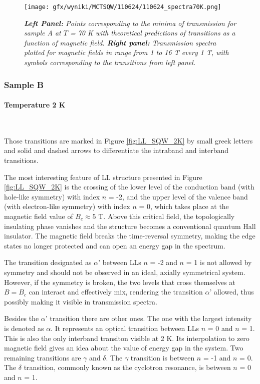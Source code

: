 \documentclass[titlepage,a4paper]{book}
\newcommand{\wciecie}{\quad\phantom{v}}
\newcommand{\myparagraph}[1]{\paragraph{#1}\mbox{}\\}
\begin{document}
\begin{figure}[ht]
	\centering
	\texttt{[image: gfx/wyniki/MCTSQW/110624/110624\_spectra70K.png]}
	\vspace{-10pt}
	\caption{\textit{\textbf{Left Panel:} Points corresponding to the minima of transmission for sample A at $T$ = 70 K with theoretical predictions of transitions as a function of magnetic field. \textbf{Right panel:} Transmission spectra plotted for magnetic fields in range from 1 to 16 T every 1 T, with symbols corresponding to the transitions from left panel.}}
	\label{fig:Spectra_110624_70K}
\end{figure}

\clearpage
\subsubsection{Sample B}
\myparagraph{Temperature 2 K}
\wciecie

Those transitions are marked in Figure \ref{fig:LL_SQW_2K} by small greek letters and solid and dashed arrows to differentiate the intraband and interband transitions.

The most interesting feature of LL structure presented in Figure \ref{fig:LL_SQW_2K} is the crossing of the lower level of the conduction band (with hole-like symmetry) with index $n$ = -2, and the upper level of the valence band (with electron-like symmetry) with index $n$ = 0, which takes place at the magnetic field value of $B_c \approx 5$ T. Above this critical field, the topologically insulating phase vanishes and the structure becomes a conventional quantum Hall insulator. The magnetic field breaks the time-reversal symmetry, making the edge states no longer protected and can open an energy gap in the spectrum.

The transition designated as $\alpha$' between LLs $n$ = -2 and $n$ = 1 is not allowed by symmetry and should not be observed in an ideal, axially symmetrical system. However, if the symmetry is broken, the two levels that cross themselves at $B = B_c$ can interact and effectively mix, rendering the transition $\alpha$' allowed, thus possibly making it visible in transmission spectra.

Besides the $\alpha$' transition there are other ones. The one with the largest intensity is denoted as $\alpha$. It represents an optical transition between LLs $n$ = 0 and $n$ = 1. This is also the only interband transiton visible at 2 K. Its interpolation to zero magnetic field gives an idea about the value of energy gap in the system. Two remaining transitions are $\gamma$ and $\delta$. The $\gamma$ transition is between $n$ = -1 and $n$ = 0. The $\delta$ transition, commonly known as the cyclotron resonance, is between $n$ = 0 and $n$ = 1.
\end{document}
